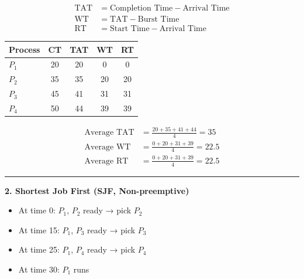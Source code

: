 \documentclass[a4paper, 10pt]{article}
\begin{document}
\begin{examplebox}{}{}
\begin{minipage}[t]{0.48\textwidth}
        \begin{align*}
            \text{TAT} & = \text{Completion Time} - \text{Arrival Time} \\
            \text{WT}  & = \text{TAT} - \text{Burst Time}               \\
            \text{RT}  & = \text{Start Time} - \text{Arrival Time}
        \end{align*}
    \end{minipage}
    \hfill
    \begin{minipage}[t]{0.48\textwidth}
        \begin{center}
            \begin{tabular}{@{} l c c c c @{}}
                \toprule
                Process & CT & TAT & WT & RT \\
                \midrule
                $P_1$   & 20 & 20  & 0  & 0  \\
                $P_2$   & 35 & 35  & 20 & 20 \\
                $P_3$   & 45 & 41  & 31 & 31 \\
                $P_4$   & 50 & 44  & 39 & 39 \\
                \bottomrule
            \end{tabular}
        \end{center}

        \begin{align*}
            \text{Average TAT} & = \frac{20 + 35 + 41 + 44}{4} = 35  \\
            \text{Average WT}  & = \frac{0 + 20 + 31 + 39}{4} = 22.5 \\
            \text{Average RT}  & = \frac{0 + 20 + 31 + 39}{4} = 22.5
        \end{align*}
    \end{minipage}

    \rule{\textwidth}{0.5pt}

    \textbf{2. Shortest Job First (SJF, Non-preemptive)}

    \begin{minipage}[t]{0.48\textwidth}
        \begin{itemize}
            \item At time 0: $P_1$, $P_2$ ready → pick $P_2$
            \item At time 15: $P_1$, $P_3$ ready → pick $P_3$
            \item At time 25: $P_1$, $P_4$ ready → pick $P_4$
            \item At time 30: $P_1$ runs
        \end{itemize}


\end{minipage}
\end{examplebox}
\end{document}
